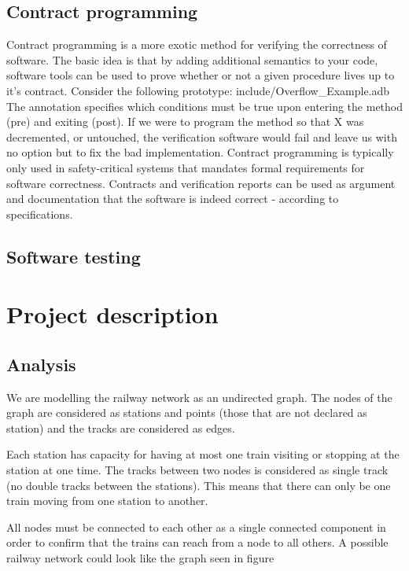 \documentclass[10pt,a4paper]{article}
\begin{document}
\subsection{Contract programming}
Contract programming is a more exotic method for verifying the correctness of software.
The basic idea is that by adding additional semantics to your code, software tools can be used to prove whether or not a given procedure lives up to it's contract.
Consider the following prototype:
 {include/Overflow_Example.adb}
The annotation specifies which conditions must be true upon entering the method (pre) and exiting (post). If we were to program the method so that X was decremented, or untouched, the verification software would fail and leave us with no option but to fix the bad implementation.
Contract programming is typically only used in safety-critical systems that mandates formal requirements for software correctness. Contracts and verification reports can be used as argument and documentation that the software is indeed correct - according to specifications.

\subsection{Software testing}

\section{Project description}

\subsection{Analysis}
We are modelling the railway network as an undirected graph. The nodes of the graph are considered as stations and points (those that are not declared as station) and the tracks are considered as edges.
 
Each station has capacity for having at most one train visiting or stopping at the station at one time.
The tracks between two nodes is considered as single track (no double tracks between the stations). This means that there can only be one train moving from one station to another.  
 
All nodes must be connected to each other as a single connected component in order to confirm that the trains can reach from a node to all others.  A possible railway network could look like the graph seen in figure 
\end{document}
